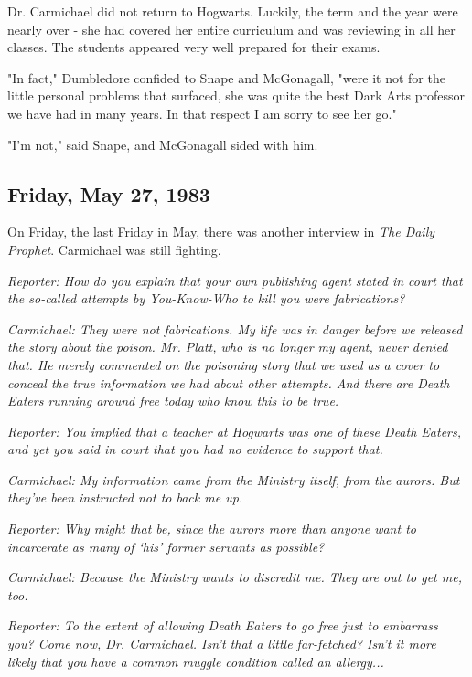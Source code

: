 \documentclass[a4paper,11pt]{article}
\begin{document}
Dr. Carmichael did not return to Hogwarts. Luckily, the term and the year were nearly over - she had covered her entire curriculum and was reviewing in all her classes. The students appeared very well prepared for their exams.

"In fact," Dumbledore confided to Snape and McGonagall, "were it not for the little personal problems that surfaced, she was quite the best Dark Arts professor we have had in many years. In that respect I am sorry to see her go."

"I'm not," said Snape, and McGonagall sided with him.

\subsection{Friday, May 27, 1983}

On Friday, the last Friday in May, there was another interview in \emph{The Daily Prophet}. Carmichael was still fighting.

\emph{Reporter: How do you explain that your own publishing agent stated in court that the so-called attempts by You-Know-Who to kill you were fabrications?}

\emph{Carmichael: They were not fabrications. My life was in danger before we released the story about the poison. Mr. Platt, who is no longer my agent, never denied that. He merely commented on the poisoning story that we used as a cover to conceal the true information we had about other attempts. And there are Death Eaters running around free today who know this to be true.}

\emph{Reporter: You implied that a teacher at Hogwarts was one of these Death Eaters, and yet you said in court that you had no evidence to support that.}

\emph{Carmichael: My information came from the Ministry itself, from the aurors. But they've been instructed not to back me up.}

\emph{Reporter: Why might that be, since the aurors more than anyone want to incarcerate as many of `his' former servants as possible?}

\emph{Carmichael: Because the Ministry wants to discredit me. They are out to get me, too.}

\emph{Reporter: To the extent of allowing Death Eaters to go free just to embarrass you? Come now, Dr. Carmichael. Isn't that a little far-fetched? Isn't it more likely that you have a common muggle condition called an allergy...}
\end{document}
